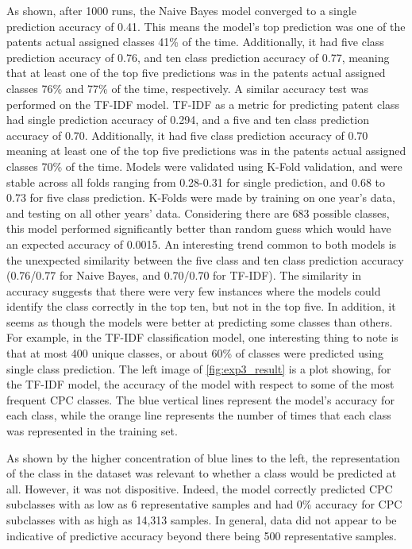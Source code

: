 \documentclass{article}
\begin{document}
As shown, after 1000 runs, the Naive Bayes model converged to a single prediction accuracy of 0.41.  This means the model’s top prediction was one of the patents actual assigned classes 41\% of the time. Additionally, it had five class prediction accuracy of 0.76, and ten class prediction accuracy of 0.77, meaning that at least one of the top five predictions was in the patents actual assigned classes 76\% and 77\% of the time, respectively.  
A similar accuracy test was performed on the TF-IDF model.  TF-IDF as a metric for predicting patent class had single prediction accuracy of 0.294, and a five and ten class prediction accuracy of 0.70. Additionally, it had five class prediction accuracy of 0.70 meaning at least one of the top five predictions was in the patents actual assigned classes 70\% of the time.
Models were validated using K-Fold validation, and were stable across all folds ranging from 0.28-0.31 for single prediction, and 0.68 to 0.73 for five class prediction. K-Folds were made by training on one year's data, and testing on all other years' data. Considering there are 683 possible classes, this model performed significantly better than random guess which would have an expected accuracy of 0.0015. 
An interesting trend common to both models is the unexpected similarity between the five class and ten class prediction accuracy (0.76/0.77 for Naive Bayes, and 0.70/0.70 for TF-IDF).  The similarity in accuracy suggests that there were very few instances where the models could identify the class correctly in the top ten, but not in the top five.  
	In addition, it seems as though the models were better at predicting some classes than others.   For example, in the TF-IDF classification model, one interesting thing to note is that at most 400 unique classes, or about 60\% of classes were predicted using single class prediction. The left image of \autoref{fig:exp3_result} is a plot showing, for the TF-IDF model, the accuracy of the model with respect to some of the most frequent CPC classes.  The blue vertical lines represent the model’s accuracy for each class, while the orange line represents the number of times that each class was represented in the training set.

As shown by the higher concentration of blue lines to the left, the representation of the class in the dataset was relevant to whether a class would be predicted at all.  However, it was not dispositive.  Indeed, the model correctly predicted CPC subclasses with as low as 6 representative samples and had 0\% accuracy for CPC subclasses with as high as 14,313 samples.  In general, data did not appear to be indicative of predictive accuracy beyond there being 500 representative samples. 
\end{document}
